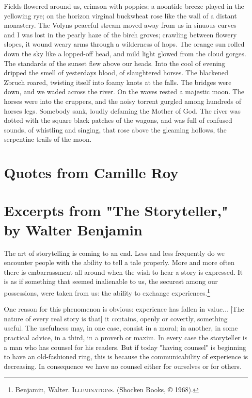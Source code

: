 \documentclass[
]{memoir}
\begin{document}
Fields flowered around us, crimson with poppies; a noontide breeze
played in the yellowing rye; on the horizon virginal buckwheat rose like
the wall of a distant monastery. The Volyns peaceful stream moved away
from us in sinuous curves and I was lost in the pearly haze of the birch
groves; crawling between flowery slopes, it wound weary arms through a
wilderness of hops. The orange sun rolled down the sky like a lopped-off
head, and mild light glowed from the cloud gorges. The standards of the
sunset flew above our heads. Into the cool of evening dripped the smell
of yesterdays blood, of slaughtered horses. The blackened Zbruch roared,
twisting itself into foamy knots at the falls. The bridges were down,
and we waded across the river. On the waves rested a majestic moon. The
horses were into the cruppers, and the noisy torrent gurgled among
hundreds of horses legs. Somebody sank, loudly defaming the Mother of
God. The river was dotted with the square black patches of the wagons,
and was full of confused sounds, of whistling and singing, that rose
above the gleaming hollows, the serpentine trails of the moon.

\hypertarget{quotes-from-camille-roy}{%
\chapter{Quotes from Camille Roy}\label{quotes-from-camille-roy}}

\hypertarget{excerpts-from-the-storyteller-by-walter-benjamin}{%
\chapter{Excerpts from "The Storyteller," by Walter
Benjamin}\label{excerpts-from-the-storyteller-by-walter-benjamin}}

The art of storytelling is coming to an end. Less and less frequently do
we encounter people with the ability to tell a tale properly. More and
more often there is embarrassment all around when the wish to hear a
story is expressed. It is as if something that seemed inalienable to us,
the securest among our possessions, were taken from us: the ability to
exchange experiences.\footnote{Benjamin, Walter. \textsc{Illuminations}.
  (Shocken Books, © 1968).}

One reason for this phenomenon is obvious: experience has fallen in
value... {[}The nature of every real story is that{]} it contains,
openly or covertly, something useful. The usefulness may, in one case,
consist in a moral; in another, in some practical advice, in a third, in
a proverb or maxim. In every case the storyteller is a man who has
counsel for his readers. But if today "having counsel" is beginning to
have an old-fashioned ring, this is because the communicability of
experience is decreasing. In consequence we have no counsel either for
ourselves or for others.
\end{document}
